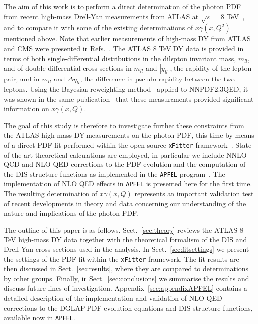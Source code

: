 The aim of this work is to perform a direct determination of the
photon PDF from recent high-mass Drell-Yan measurements from
ATLAS  at $\sqrt{s}=8$ TeV~\cite{Aad:2016zzw}, and to
compare it with some of the existing determinations of $x\gamma(x,Q^2)$
mentioned above.
%
Note that
earlier measurements of high-mass DY from ATLAS and CMS were presented
in Refs.~\cite{CMS:2014jea,Chatrchyan:2013tia,Aad:2013iua}.
%
The ATLAS 8 TeV DY data is provided in terms of both
single-differential distributions in the dilepton invariant mass,
$m_{ll}$, and of double-differential
cross sections in $m_{ll}$ and $|y_{ll}|$, the rapidity of the
lepton pair, and in $m_{ll}$ and $\Delta\eta_{ll}$, the difference in
pseudo-rapidity between the two leptons.
%
Using the Bayesian reweighting method~\cite{Ball:2011gg,Ball:2010gb}
applied to NNPDF2.3QED, it was shown in the
same publication~\cite{Aad:2016zzw} that these
measurements provided significant information on $x\gamma(x,Q)$.

The goal of this study is therefore to investigate further these
constraints from the ATLAS high-mass DY measurements on the photon PDF,
this time by means of a direct PDF fit performed within the
open-source {\tt xFitter} framework~\cite{Alekhin:2014irh}.
%
State-of-the-art theoretical calculations are employed, in particular
we include NNLO QCD and NLO QED corrections to the PDF evolution and
the computation of the DIS structure
functions as implemented in the {\tt APFEL} program~\cite{Bertone:2013vaa}.
%
The implementation of NLO QED effects in {\tt APFEL} is
presented here for
the first time.
%
The resulting determination of $x\gamma(x,Q)$
represents an important validation test of
recent developments in theory and data concerning
our understanding of the nature and implications
of the photon PDF.

The outline of this paper is as follows.
%
Sect.~\ref{sec:theory} reviews the ATLAS 8 TeV high-mass DY data together
with the theoretical formalism of the DIS and Drell-Yan cross-sections
used in the analysis.
%
In Sect.~\ref{sec:fitsettings} we present the settings of the PDF
fit within the {\tt xFitter} framework.
% 
The fit results are then discussed in Sect.~\ref{sec:results}, where
they are compared to determinations by other groups.
%
Finally, in Sect.~\ref{sec:conclusions} we summarise the results and
discuss future lines of investigation.
%
Appendix~\ref{sec:appendixAPFEL} contains a detailed
description of the implementation and validation of NLO QED
corrections to the DGLAP PDF evolution equations
and DIS structure functions,
available now in {\tt APFEL}.
